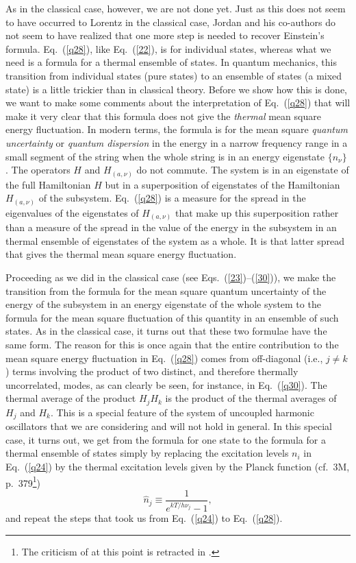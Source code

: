 \documentclass{elsart}
\begin{document}
{As in the classical case, however, we are not done yet. Just as this does not seem to have occurred to Lorentz in the classical case, Jordan and his co-authors do not seem to have realized that one more step is needed to recover Einstein's formula. Eq.\ (\ref{q28}), like Eq.\ (\ref{22}), is for individual states, whereas what we need is a formula for a thermal ensemble of states. In quantum mechanics, this transition from individual states (pure states) to an ensemble of states (a mixed state) is a little trickier than in classical theory. Before we show how this is done, we 
want to make some comments about the interpretation of Eq.\ (\ref{q28}) that will make it very clear that this formula does not give the {\it thermal} mean square energy fluctuation. In modern terms,
the formula is for the mean square {\it quantum uncertainty} or {\it quantum dispersion} in the energy in a narrow frequency range in a small segment of the string when the whole string is in an energy eigenstate $\{ n_\nu \}$ . The operators $H$ and $H_{(a, \nu)}$ do not commute. The system is in an eigenstate of the full Hamiltonian $H$ but in a superposition of eigenstates of the Hamiltonian $H_{(a, \nu)}$ of the subsystem. Eq.\ (\ref{q28}) is a measure for the spread in the eigenvalues of the eigenstates of $H_{(a, \nu)}$ that make up this superposition rather than a measure of the spread in the value of the energy in the subsystem in an thermal ensemble of eigenstates of the system as a whole. It is that latter spread that gives the thermal mean square energy fluctuation. 

Proceeding as we did in the classical case (see Eqs.\ (\ref{23})--(\ref{30})), we make the transition from the formula for the mean square quantum uncertainty of the energy of the subsystem in an energy eigenstate of the whole system to the formula for the mean square fluctuation of this quantity in an ensemble of such states. As in the classical case, it turns out that these two formulae have the same form. The reason for this is once again that the entire
contribution to the mean square energy fluctuation in Eq.\ (\ref{q28}) comes from off-diagonal (i.e., $j \neq k$) terms involving the
product of two distinct, and therefore thermally uncorrelated, modes, as can clearly be seen, for instance, in Eq.\ (\ref{q30}). The thermal average of the product $H_j H_k$ is the product of the thermal averages of $H_j$ and $H_k$. This is a special feature of the system of uncoupled harmonic oscillators that we are considering and will not hold in general. In this special case, it turns out, we get from the formula for one state to the formula for a thermal ensemble of states simply by replacing the excitation levels $n_i$ in Eq.\ (\ref{q24}) by the thermal excitation levels given by the Planck function (cf.\ 3M, p.\ 379\footnote{The criticism of \citep{Debye 1910} at this point is retracted in \citep[p.\ 182, note]{Jordan 1928}.})
\begin{equation}
\hat{n}_{j} \equiv \frac{1}{e^{kT/h \nu_j}-1},
\label{q37}
\end{equation}
and repeat the steps that took us from Eq.\ (\ref{q24}) to Eq.\ (\ref{q28}).

}
\end{document}
